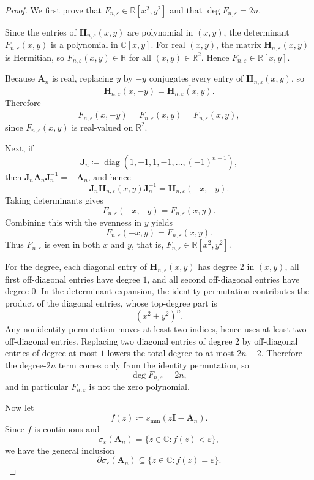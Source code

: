 \documentclass[11pt]{article}
\begin{document}
\begin{proof}
We first prove that \(F_{n,\varepsilon}\in\mathbb{R}[x^2,y^2]\) and that
\(\deg F_{n,\varepsilon}=2n\).

Since the entries of \(\mathbf{H}_{n,\varepsilon}(x,y)\) are polynomial in \((x,y)\),
the determinant \(F_{n,\varepsilon}(x,y)\) is a polynomial in \(\mathbb{C}[x,y]\).
For real \((x,y)\), the matrix \(\mathbf{H}_{n,\varepsilon}(x,y)\) is Hermitian, so
\(F_{n,\varepsilon}(x,y)\in\mathbb{R}\) for all \((x,y)\in\mathbb{R}^2\).
Hence \(F_{n,\varepsilon}\in\mathbb{R}[x,y]\).

Because \(\mathbf{A}_n\) is real, replacing \(y\) by \(-y\) conjugates every entry of
\(\mathbf{H}_{n,\varepsilon}(x,y)\), so
\[
\mathbf{H}_{n,\varepsilon}(x,-y)=\overline{\mathbf{H}_{n,\varepsilon}(x,y)}.
\]
Therefore
\[
F_{n,\varepsilon}(x,-y)=\overline{F_{n,\varepsilon}(x,y)}=F_{n,\varepsilon}(x,y),
\]
since \(F_{n,\varepsilon}(x,y)\) is real-valued on \(\mathbb{R}^2\).

Next, if
\[
\mathbf{J}_n\coloneqq \operatorname{diag}(1,-1,1,-1,\dots,(-1)^{n-1}),
\]
then \(\mathbf{J}_n\mathbf{A}_n\mathbf{J}_n^{-1}=-\mathbf{A}_n\), and hence
\[
\mathbf{J}_n\mathbf{H}_{n,\varepsilon}(x,y)\mathbf{J}_n^{-1}
=\mathbf{H}_{n,\varepsilon}(-x,-y).
\]
Taking determinants gives
\[
F_{n,\varepsilon}(-x,-y)=F_{n,\varepsilon}(x,y).
\]
Combining this with the evenness in \(y\) yields
\[
F_{n,\varepsilon}(-x,y)=F_{n,\varepsilon}(x,y).
\]
Thus \(F_{n,\varepsilon}\) is even in both \(x\) and \(y\), that is,
\(F_{n,\varepsilon}\in\mathbb{R}[x^2,y^2]\).

For the degree, each diagonal entry of \(\mathbf{H}_{n,\varepsilon}(x,y)\) has degree \(2\) in \((x,y)\),
all first off-diagonal entries have degree \(1\), and all second off-diagonal entries have degree \(0\).
In the determinant expansion, the identity permutation contributes the product of the diagonal entries,
whose top-degree part is
\[
(x^2+y^2)^n.
\]
Any nonidentity permutation moves at least two indices, hence uses at least two off-diagonal entries.
Replacing two diagonal entries of degree \(2\) by off-diagonal entries of degree at most \(1\)
lowers the total degree to at most \(2n-2\).
Therefore the degree-\(2n\) term comes only from the identity permutation, so
\[
\deg F_{n,\varepsilon}=2n,
\]
and in particular \(F_{n,\varepsilon}\) is not the zero polynomial.

Now let
\[
f(z)\coloneqq s_{\min}(z\mathbf{I}-\mathbf{A}_n).
\]
Since \(f\) is continuous and
\[
\sigma_\varepsilon(\mathbf{A}_n)=\{z\in\mathbb{C}:f(z)<\varepsilon\},
\]
we have the general inclusion
\[
\partial\sigma_\varepsilon(\mathbf{A}_n)\subseteq \{z\in\mathbb{C}:f(z)=\varepsilon\}.
\]


\end{proof}
\end{document}
